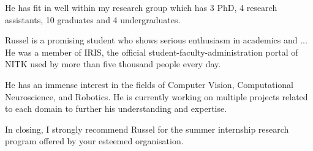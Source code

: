 \documentclass[12pt]{article}
\begin{document}
\medskip
\noindent
He has fit in well within my research group which has 3 PhD, 4 research assistants, 10 graduates and 4 undergraduates. %

\medskip
\noindent
Russel is a promising student who shows serious enthusiasm in academics and ...
He was a member of IRIS, the official student-faculty-administration portal of NITK used by more than five thousand people every day. %

\medskip
\noindent
He has an immense interest in the fields of Computer Vision, Computational Neuroscience, and Robotics. He is currently working on multiple projects related to each domain to further his understanding and expertise. %

\medskip
\noindent
In closing, I strongly recommend Russel for the summer internship research program offered by your esteemed organisation. %
\end{document}
